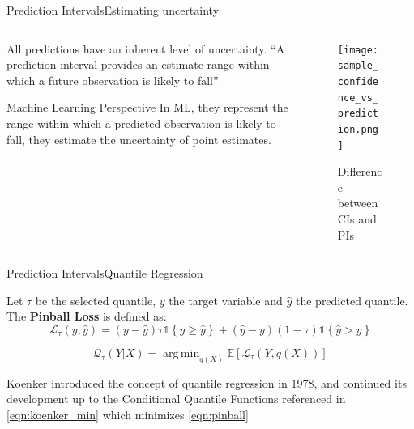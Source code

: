 \documentclass{beamer}
\DeclareMathOperator*{\argmin}{arg\,min}
\begin{document}
            \begin{frame}{Prediction Intervals}{Estimating uncertainty}

                \begin{columns}
                    \begin{column}{0.5\textwidth}
                        All predictions have an inherent level of uncertainty. \enquote{A prediction interval provides an estimate range within which a future observation is likely to fall} \cite{peters-2023}
                        \begin{exampleblock}{Machine Learning Perspective}
                            In ML, they represent the range within which a predicted observation is likely to fall, they estimate the uncertainty of point estimates.
                        \end{exampleblock}
                    \end{column}
                    \begin{column}{0.5\textwidth}
                        \begin{figure}[!htbp]
                            \centering
                            \texttt{[image: sample\_confidence\_vs\_prediction.png]}
                            \caption{Difference between CIs and PIs \cite{cialdella-2020}}
                        \end{figure}
                    \end{column}
                \end{columns}
            \end{frame}

            \begin{frame}{Prediction Intervals}{Quantile Regression}

                Let $\tau$ be the selected quantile, $y$ the target variable and $\hat{y}$ the predicted quantile. The \textbf{Pinball Loss} is defined as:
                \begin{equation}\label{eqn:pinball}
                    \mathcal{L}_\tau(y, \hat{y}) = (y - \hat{y}) \tau \mathds{1} \left\{y \geq \hat{y}\right\} + (\hat{y} - y) (1 - \tau) \mathds{1} \left\{\hat{y} > y\right\}
                \end{equation}

                \begin{equation}\label{eqn:koenker_min}
                    \mathcal{Q}_\tau(Y | X) = \argmin_{q(X)} \mathbb{E}[\mathcal{L}_\tau(Y, q(X))]
                \end{equation}

                Koenker introduced the concept of quantile regression in 1978, and continued its development up to the Conditional Quantile Functions \cite{koenker2001quantile} referenced in \eqref{eqn:koenker_min} which minimizes \eqref{eqn:pinball}
            \end{frame}
\end{document}

